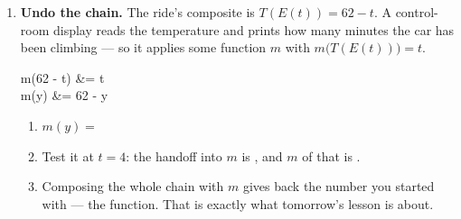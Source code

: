 \documentclass[10pt]{article}
\begin{document}
\begin{tcolorbox}[colback=white, colframe=black!40,
    title=\textbf{Tier E --- Extension},
    fonttitle=\bfseries, arc=2mm, left=3mm, right=3mm, top=2mm, bottom=2mm]
\begin{enumerate}[itemsep=8pt]
  \item \textbf{Undo the chain.} The ride's composite is $T(E(t)) = 62 - t$.
        A control-room display reads the temperature and prints how many
        minutes the car has been climbing --- so it applies some function $m$
        with $m\big(T(E(t))\big) = t$.

        \begin{work}
          m(62 - t) &= t \\
              m(y)  &= 62 - y
        \end{work}

        \begin{enumerate}[label=(\alph*), itemsep=4pt]
          \item $m(y) = $ \blank{2.6cm}
          \item Test it at $t = 4$: the handoff into $m$ is \blank{1.6cm},
                and $m$ of that is \blank{1.6cm}.
          \item Composing the whole chain with $m$ gives back the number you
                started with --- the \blank{2.6cm} function. That is exactly
                what tomorrow's lesson is about.
        \end{enumerate}
\end{enumerate}
\end{tcolorbox}
\end{document}
